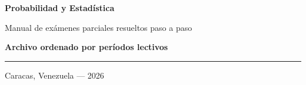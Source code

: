 \documentclass[11pt, a4paper]{article}
\begin{document}
\begin{titlepage}
    \vspace{3.5cm}

    {\LARGE \bfseries\color{primary} Probabilidad y Estadística\par}
    \vspace{0.4cm}
    {\large Manual de exámenes parciales resueltos paso a paso\par}
    \vspace{0.3cm}
    {\normalsize\color{secondary}\bfseries Archivo ordenado por períodos lectivos\par}

    \vspace{1.5cm}
    {\color{bordercolor}\rule{0.5\textwidth}{0.8pt}}

    \vfill

    {\normalsize Caracas, Venezuela --- 2026\par}
\end{titlepage}

\tableofcontents
\clearpage

\renewcommand{\hOneTocLevel}{subsection}
\hTwoAddToTocfalse



\end{document}
